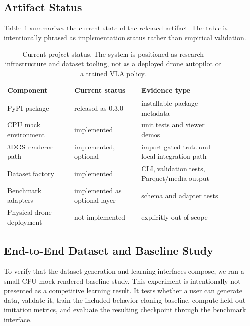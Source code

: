 \documentclass[11pt]{article}
\begin{document}
\subsection{Artifact Status}

Table~\ref{tab:status} summarizes the current state of the released artifact. The table is intentionally phrased as implementation status rather than empirical validation.

\begin{table}[t]
\centering
\begin{tabular}{p{0.27\linewidth}p{0.27\linewidth}p{0.34\linewidth}}
\toprule
Component & Current status & Evidence type \\
\midrule
PyPI package & released as 0.3.0 & installable package metadata \\
CPU mock environment & implemented & unit tests and viewer demos \\
3DGS renderer path & implemented, optional & import-gated tests and local integration path \\
Dataset factory & implemented & CLI, validation tests, Parquet/media output \\
Benchmark adapters & implemented as optional layer & schema and adapter tests \\
Physical drone deployment & not implemented & explicitly out of scope \\
\bottomrule
\end{tabular}
\caption{Current project status. The system is positioned as research infrastructure and dataset tooling, not as a deployed drone autopilot or a trained VLA policy.}
\label{tab:status}
\end{table}

\subsection{End-to-End Dataset and Baseline Study}

To verify that the dataset-generation and learning interfaces compose, we ran a small CPU mock-rendered baseline study. This experiment is intentionally not presented as a competitive learning result. It tests whether a user can generate data, validate it, train the included behavior-cloning baseline, compute held-out imitation metrics, and evaluate the resulting checkpoint through the benchmark interface.
\end{document}
